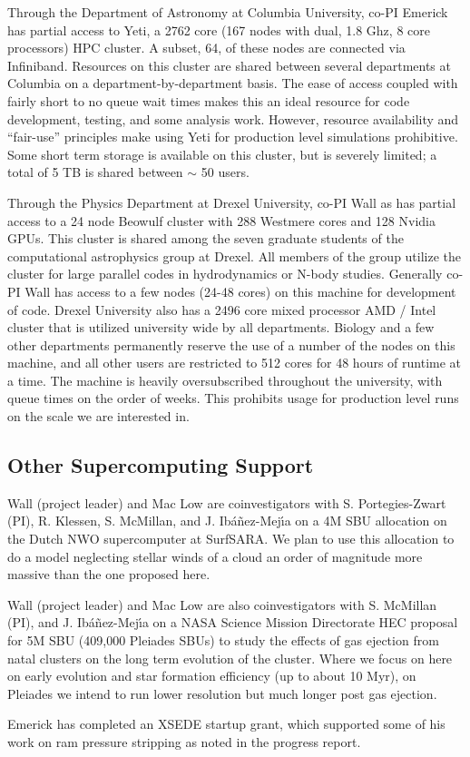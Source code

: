 \documentclass[11pt]{article}
\begin{document}
Through the Department of Astronomy at Columbia University, co-PI Emerick has partial access to Yeti, a 2762 core (167 nodes with dual, 1.8 Ghz, 8 core processors) HPC cluster. A subset, 64, of these nodes are connected via Infiniband. Resources on this cluster are shared between several departments at Columbia on a department-by-department basis. The ease of access coupled with fairly short to no queue wait times makes this an ideal resource for code development, testing, and some analysis work. However, resource availability and ``fair-use'' principles make using Yeti for production level simulations prohibitive. Some short term storage is available on this cluster, but is severely limited; a total of 5 TB is shared between $\sim$ 50 users.

Through the Physics Department at Drexel University, co-PI Wall as has partial access to a 24 node Beowulf cluster with 288 Westmere cores and 128 Nvidia GPUs. This cluster is shared among the seven graduate students of the computational astrophysics group at Drexel. All members of the group utilize the cluster for large parallel codes in hydrodynamics or N-body studies. Generally co-PI Wall has access to a few nodes (24-48 cores) on this machine for development of code. Drexel University also has a 2496 core mixed processor AMD / Intel cluster that is utilized university wide by all departments. Biology and a few other departments permanently reserve the use of a number of the nodes on this machine, and all other users are restricted to 512 cores for 48 hours of runtime at a time. The machine is heavily oversubscribed throughout the university, with queue times on the order of weeks. This prohibits usage for production level runs on the scale we are interested in.

\subsection{Other Supercomputing Support}

Wall (project leader) and Mac Low are coinvestigators with S. Portegies-Zwart (PI), R. Klessen,  S. McMillan, and J. Ib\'a\~nez-Mej\'{\i}a on a 4M SBU allocation on the Dutch NWO supercomputer at SurfSARA.  We plan to use this allocation to do a model neglecting stellar winds of a cloud an order of magnitude more massive than the one proposed here.

Wall (project leader) and Mac Low are also coinvestigators with S. McMillan (PI), and J. Ib\'a\~nez-Mej\'{\i}a on a NASA Science Mission Directorate HEC proposal for 5M SBU (409,000 Pleiades SBUs) to study the effects of gas ejection from natal clusters on the long term evolution of the cluster. Where we focus on here on early evolution and star formation efficiency (up to about 10 Myr), on Pleiades we intend to run lower resolution but much longer post gas ejection.
 
Emerick has completed an XSEDE startup grant, which supported some of his work on ram pressure stripping as noted in the progress report.

\clearpage


\end{document}

